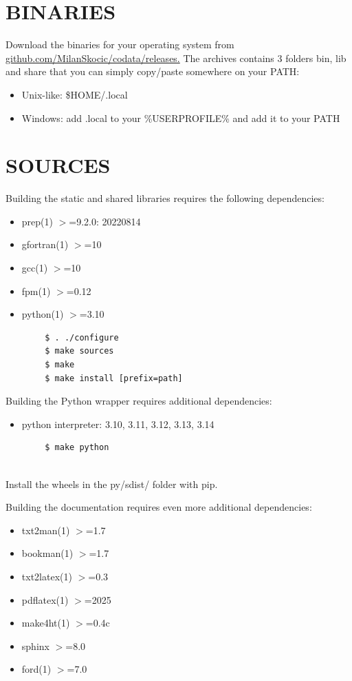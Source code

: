 \section*{BINARIES}
Download the binaries for your operating system from 
\href{https://github.com/MilanSkocic/codata/releases}{github.com/MilanSkocic/codata/releases.} 
The archives contains 3 folders bin, lib and share that you can simply
copy/paste somewhere on your PATH:
\begin{itemize}
\item Unix-like: \$HOME/.local
\item Windows: add .local to your \%USERPROFILE\% and add it to your PATH
\end{itemize}


\section*{SOURCES}
Building the static and shared libraries requires the following dependencies:
\begin{itemize}
\item prep(1) $>$=9.2.0: 20220814
\item gfortran(1) $>$=10
\item gcc(1) $>$=10
\item fpm(1) $>$=0.12
\item python(1) $>$=3.10
\end{itemize}
 
\begin{verbatim}
        $ . ./configure
        $ make sources
        $ make
        $ make install [prefix=path]

\end{verbatim}
Building the Python wrapper requires additional dependencies:
\begin{itemize}
\item python interpreter: 3.10, 3.11, 3.12, 3.13, 3.14
\end{itemize}

\begin{verbatim}
        $ make python
  
\end{verbatim}
Install the wheels in the py/sdist/ folder with pip.

Building the documentation requires even more additional dependencies:
\begin{itemize}
\item txt2man(1) $>$=1.7
\item bookman(1) $>$=1.7
\item txt2latex(1) $>$=0.3
\item pdflatex(1) $>$=2025
\item make4ht(1) $>$=0.4c
\item sphinx $>$=8.0
\item ford(1) $>$=7.0
\end{itemize}
